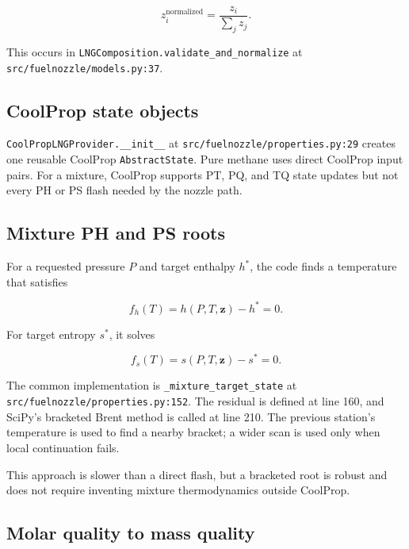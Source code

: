 \documentclass[11pt]{article}
\newcommand{\code}[1]{\nolinkurl{#1}}
\newcommand{\srcline}[2]{\nolinkurl{#1:#2}}
\begin{document}
\begin{equation}
  z_i^{\mathrm{normalized}} = \frac{z_i}{\sum_j z_j}.
  \label{eq:composition-normalization}
\end{equation}

This occurs in \code{LNGComposition.validate_and_normalize} at
\srcline{src/fuelnozzle/models.py}{37}.

\subsection{CoolProp state objects}

\code{CoolPropLNGProvider.__init__} at
\srcline{src/fuelnozzle/properties.py}{29} creates one reusable CoolProp
\code{AbstractState}. Pure methane uses direct CoolProp input pairs. For a mixture,
CoolProp supports PT, PQ, and TQ state updates but not every PH or PS flash needed by
the nozzle path.

\subsection{Mixture PH and PS roots}

For a requested pressure $P$ and target enthalpy $h^*$, the code finds a temperature
that satisfies

\begin{equation}
  f_h(T) = h(P,T,\mathbf z)-h^* = 0.
  \label{eq:ph-root}
\end{equation}

For target entropy $s^*$, it solves

\begin{equation}
  f_s(T) = s(P,T,\mathbf z)-s^* = 0.
  \label{eq:ps-root}
\end{equation}

The common implementation is \code{_mixture_target_state} at
\srcline{src/fuelnozzle/properties.py}{152}. The residual is defined at line 160,
and SciPy's bracketed Brent method is called at line 210. The previous station's
temperature is used to find a nearby bracket; a wider scan is used only when local
continuation fails.

This approach is slower than a direct flash, but a bracketed root is robust and does
not require inventing mixture thermodynamics outside CoolProp.

\subsection{Molar quality to mass quality}
\end{document}
